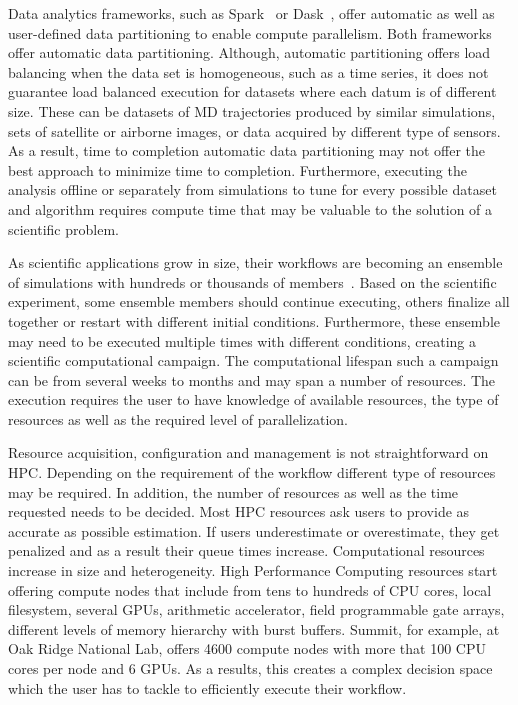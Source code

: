 Data analytics frameworks, such as Spark~\cite{zaharia2010spark} or Dask~\cite{rocklin2015dask}, 
offer automatic as well as user-defined data partitioning to enable compute parallelism. 
Both frameworks offer automatic data partitioning. Although, automatic partitioning 
offers load balancing when the data set is homogeneous, such as a time series, 
it does not guarantee load balanced execution for datasets where each datum is 
of different size. These can be datasets of MD trajectories produced by similar 
simulations, sets of satellite or airborne images, or data acquired by different 
type of sensors. As a result, time to completion automatic data partitioning may 
not offer the best approach to minimize time to completion. Furthermore, executing 
the analysis offline or separately from simulations to tune for every possible 
dataset and algorithm requires compute time that may be valuable to the solution 
of a scientific problem.

As scientific applications grow in size, their workflows are becoming an ensemble 
of simulations with hundreds or thousands of members~\cite{malawski2015algorithms,rietmann2012forward}. 
Based on the scientific experiment, some ensemble members should continue executing, 
others finalize all together or restart with different initial conditions. Furthermore, 
these ensemble may need to be executed multiple times with different conditions, 
creating a  scientific computational campaign. The computational lifespan such a 
campaign can be from several weeks to months and may span a number of resources. 
The execution requires the user to have knowledge of available resources, the type 
of resources as well as the required level of parallelization.

Resource acquisition, configuration and management is not straightforward on HPC. 
Depending on the requirement of the workflow different type of resources may be 
required. In addition, the number of resources as well as the time requested needs 
to be decided. Most HPC resources ask users to provide as accurate as possible 
estimation. If users underestimate or overestimate, they get penalized and as a 
result their queue times increase. Computational resources increase in size and 
heterogeneity. High Performance Computing resources start offering compute nodes 
that include from tens to hundreds of CPU cores, local filesystem, several GPUs, 
arithmetic accelerator, field programmable gate arrays, different levels of memory 
hierarchy with burst buffers. Summit, for example, at Oak Ridge National Lab, 
offers 4600 compute nodes with more that 100 CPU cores per node and 6 GPUs. As a 
results, this creates a complex decision space which the user has to tackle to 
efficiently execute their workflow.

